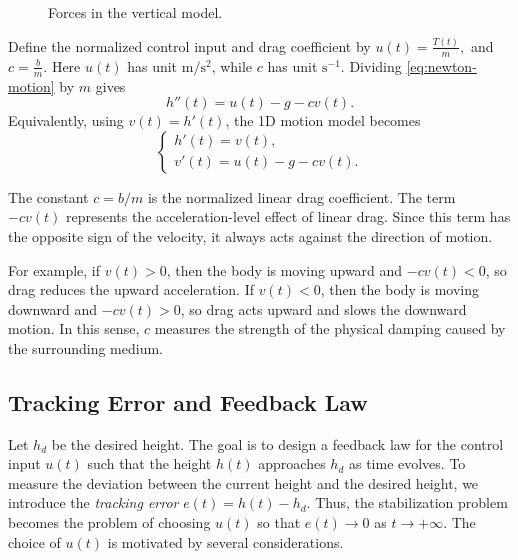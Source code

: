 ﻿\documentclass[12pt]{article}
\begin{document}
\begin{figure}[h]
\centering
{}
\caption{Forces in the vertical model.}
\end{figure}
Define the normalized control input and drag coefficient by
$u(t) = \frac{T(t)}{m},$ and $c = \frac{b}{m}.$
Here $u(t)$ has unit $\mathrm{m/s^2}$, while $c$ has unit $\mathrm{s^{-1}}$. Dividing \eqref{eq:newton-motion} by $m$ gives
\begin{equation}\label{eq:normalized-motion}
 h''(t) = u(t) - g - cv(t).
\end{equation}
Equivalently, using $v(t) = h'(t)$, the 1D motion model becomes
\begin{equation}\label{eq:motion-system}
\boxed{
\begin{cases}
 h'(t) = v(t),\\
 v'(t) = u(t) - g - cv(t).
\end{cases}
}
\end{equation}

The constant $c = b/m$ is the normalized linear drag coefficient. The term $-cv(t)$ represents the acceleration-level effect of linear drag. 
Since this term has the opposite sign of the velocity, it always acts against the direction of motion. 

For example, if $v(t) > 0$, then the body is moving upward and $-cv(t) < 0$, so drag reduces the upward acceleration. 
If $v(t) < 0$, then the body is moving downward and $-cv(t) > 0$, so drag acts upward and slows the downward motion. 
In this sense, $c$ measures the strength of the physical damping caused by the surrounding medium.

\subsection{Tracking Error and Feedback Law}
Let $h_d$ be the desired height. The goal is to design a feedback law for the control input $u(t)$ such that the height $h(t)$ approaches $h_d$ as time evolves. To measure the deviation between the current height and the desired height, we introduce the \textit{tracking error} $e(t) = h(t) - h_d.$ Thus, the stabilization problem becomes the problem of choosing $u(t)$ so that $e(t) \to 0$ as $t \to + \infty$. The choice of $u(t)$ is motivated by several considerations.
\end{document}
